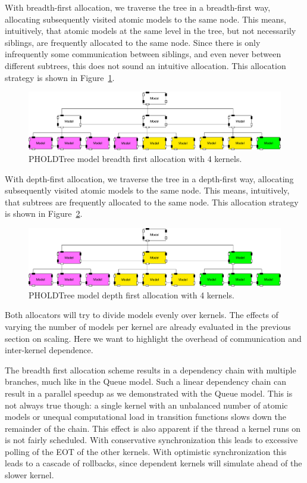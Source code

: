 With breadth-first allocation, we traverse the tree in a breadth-first way, allocating subsequently visited atomic models to the same node.
This means, intuitively, that atomic models at the same level in the tree, but not necessarily siblings, are frequently allocated to the same node.
Since there is only infrequently some communication between siblings, and even never between different subtrees, this does not sound an intuitive allocation.
This allocation strategy is shown in Figure~\ref{fig:PholdTree_model_bfs}.

\begin{figure}
   \center
   \includegraphics[width=\columnwidth]{fig/pholdtree_alloc_BF.pdf}
   \caption{PHOLDTree model breadth first allocation with 4 kernels.}
   \label{fig:PholdTree_model_bfs}
\end{figure}

With depth-first allocation, we traverse the tree in a depth-first way, allocating subsequently visited atomic models to the same node.
This means, intuitively, that subtrees are frequently allocated to the same node.
This allocation strategy is shown in Figure~\ref{fig:PholdTree_model_dfs}.

\begin{figure}
   \center
   \includegraphics[width=\columnwidth]{fig/pholdtree_alloc_DF.pdf}
   \caption{PHOLDTree model depth first allocation with 4 kernels.}
   \label{fig:PholdTree_model_dfs}
\end{figure}

Both allocators will try to divide models evenly over kernels.
The effects of varying the number of models per kernel are already evaluated in the previous section on scaling.
Here we want to highlight the overhead of communication and inter-kernel dependence. 

The breadth first allocation scheme results in a dependency chain with multiple branches, much like in the Queue model.
Such a linear dependency chain can result in a parallel speedup as we demonstrated with the Queue model.
This is not always true though: a single kernel with an unbalanced number of atomic models or unequal computational load in transition functions slows down the remainder of the chain.
This effect is also apparent if the thread a kernel runs on is not fairly scheduled.
With conservative synchronization this leads to excessive polling of the EOT of the other kernels.
With optimistic synchronization this leads to a cascade of rollbacks, since dependent kernels will simulate ahead of the slower kernel.


